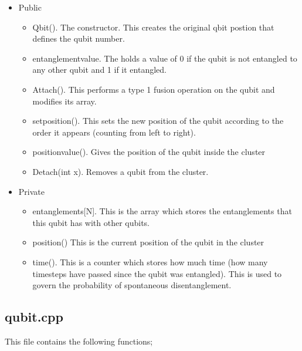 \documentclass{article}
\numberwithin{equation}{section} %
\begin{document}
\begin{itemize}
\item Public
\begin{itemize}

\item Qbit(). The constructor. This creates the original qbit postion that defines the qubit number.
\item entanglement\textunderscore value. The holds a value of 0 if the qubit is not entangled to any other qubit and 1 if it entangled. 
\item Attach(). This performs a type 1 fusion operation on the qubit and modifies its array.
\item set\textunderscore position(). This sets the new position of the qubit according to the order it appears (counting from left to right). 
\item position\textunderscore value(). Gives the position of the qubit inside the cluster
\item Detach(int x). Removes a qubit from the cluster.
\end{itemize}

\item Private
\begin{itemize}

\item entanglements[N]. This is the array which stores the entanglements that this qubit has with other qubits. 
\item position() This is the current position of the qubit in the cluster 
\item time(). This is a counter which stores how much time (how many timesteps have passed since the qubit was entangled). This is used to govern the probability of spontaneous disentanglement.
\end{itemize}

\end{itemize}

\subsection{qubit.cpp} This file contains the following functions;
\end{document}
